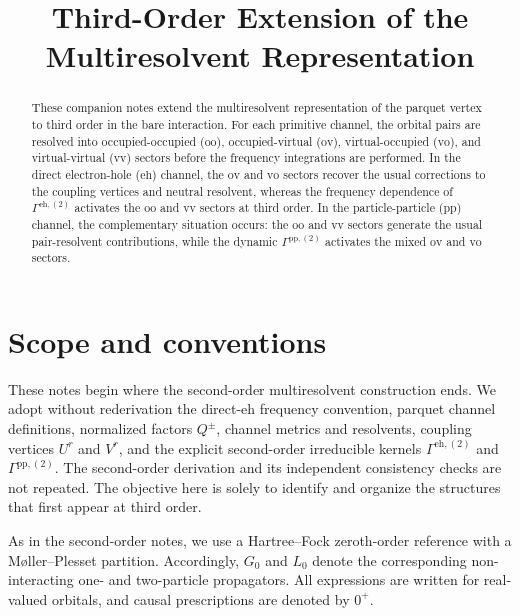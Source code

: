 \documentclass[aip,jcp,reprint,noshowkeys,superscriptaddress]{revtex4-1}
\newcommand{\eh}{\text{eh}}
\newcommand{\pp}{\text{pp}}
\newcommand{\LCPQ}{Laboratoire de Chimie et Physique Quantiques (UMR 5626), Universit\'e de Toulouse, CNRS, UPS, France}
\begin{document}
\title{Third-Order Extension of the Multiresolvent Representation}


\begin{abstract}
These companion notes extend the multiresolvent representation of the parquet
vertex to third order in the bare interaction.
For each primitive channel, the orbital pairs are resolved into
occupied-occupied ($\text{oo}$), occupied-virtual ($\text{ov}$), virtual-occupied ($\text{vo}$),
and virtual-virtual ($\text{vv}$) sectors before the frequency integrations are
performed.
In the direct electron-hole ($\eh$) channel, the $\text{ov}$ and $\text{vo}$ sectors recover
the usual corrections to the coupling vertices and neutral resolvent, whereas
the frequency dependence of $\Gamma^{\eh,(2)}$ activates the $\text{oo}$ and $\text{vv}$
sectors at third order.
In the particle-particle ($\pp$) channel, the complementary situation occurs:
the $\text{oo}$ and $\text{vv}$ sectors generate the usual pair-resolvent contributions,
while the dynamic $\Gamma^{\pp,(2)}$ activates the mixed $\text{ov}$ and $\text{vo}$ sectors.
\end{abstract}

\maketitle

\section{Scope and conventions}
\label{sec:introduction}

These notes begin where the second-order multiresolvent construction ends.
We adopt without rederivation the direct-$\eh$ frequency convention, parquet
channel definitions, normalized factors $Q^\pm$, channel metrics and
resolvents, coupling vertices $U^r$ and $V^r$, and the explicit second-order
irreducible kernels $\Gamma^{\eh,(2)}$ and $\Gamma^{\pp,(2)}$.
The second-order derivation and its independent consistency checks are not
repeated.
The objective here is solely to identify and organize the structures that
first appear at third order.

As in the second-order notes, we use a Hartree--Fock zeroth-order reference
with a M{\o}ller--Plesset partition.
Accordingly, $G_0$ and $L_0$ denote the corresponding non-interacting
one- and two-particle propagators.
All expressions are written for real-valued orbitals, and causal
prescriptions are denoted by $0^+$.
\end{document}
